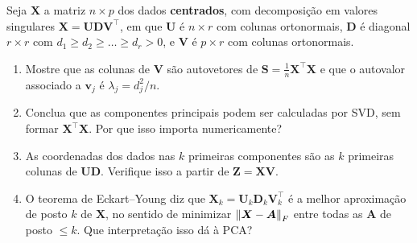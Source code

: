 \documentclass[11pt,a4paper]{article}
\begin{document}
\begin{exercicio}
Seja $\bm X$ a matriz $n\times p$ dos dados \textbf{centrados}, com decomposição
em valores singulares $\bm X = \bm U\bm D\bm V^\top$, em que $\bm U$ é
$n\times r$ com colunas ortonormais, $\bm D$ é diagonal $r\times r$ com
$d_1\ge d_2\ge\dots\ge d_r>0$, e $\bm V$ é $p\times r$ com colunas ortonormais.
\begin{enumerate}[label=(\alph*),leftmargin=1.1cm]
  \item Mostre que as colunas de $\bm V$ são autovetores de
        $\bm S=\tfrac1n\bm X^\top\bm X$ e que o autovalor associado a $\bm v_j$
        é $\lambda_j = d_j^2/n$.
  \item Conclua que as componentes principais podem ser calculadas por SVD, sem
        formar $\bm X^\top\bm X$. Por que isso importa numericamente?
  \item As coordenadas dos dados nas $k$ primeiras componentes são as $k$
        primeiras colunas de $\bm U\bm D$. Verifique isso a partir de
        $\bm Z = \bm X\bm V$.
  \item O teorema de Eckart--Young diz que
        $\bm X_k = \bm U_k\bm D_k\bm V_k^\top$ é a melhor aproximação de posto
        $k$ de $\bm X$, no sentido de minimizar $\left\lVert \bm X - \bm A \right\rVert_F$ entre
        todas as $\bm A$ de posto $\le k$. Que interpretação isso dá à PCA?
\end{enumerate}
\end{exercicio}
\end{document}
